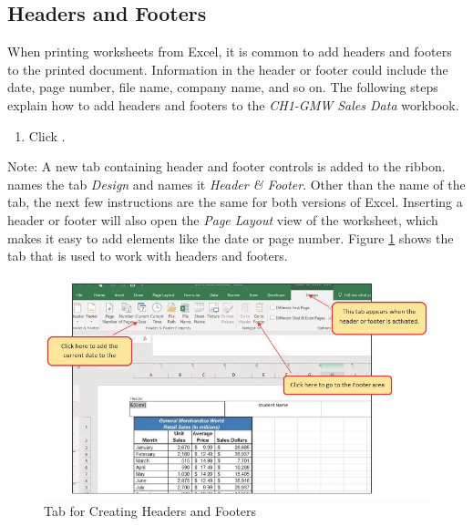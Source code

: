 \subsection{Headers and Footers}

When printing worksheets from Excel, it is common to add headers and footers to the printed document. Information in the header or footer could include the date, page number, file name, company name, and so on. The following steps explain how to add headers and footers to the \textit{CH1-GMW Sales Data} workbook.

\begin{enumbox}
	\begin{enumerate}
		\item Click . 
	\end{enumerate}
\end{enumbox}

Note: A new tab containing header and footer controls is added to the ribbon.  names the tab \textit{Design} and  names it \textit{Header \& Footer}. Other than the name of the tab, the next few instructions are the same for both versions of Excel. Inserting a header or footer will also open the \textit{Page Layout} view of the worksheet, which makes it easy to add elements like the date or page number. Figure \ref{01:fig50} shows the tab that is used to work with headers and footers.

\begin{figure}[H]
	\centering
	\includegraphics[width=\maxwidth{.95\linewidth}]{gfx/ch01_fig50}
	\caption{Tab for Creating Headers and Footers}
	\label{01:fig50}
\end{figure}

